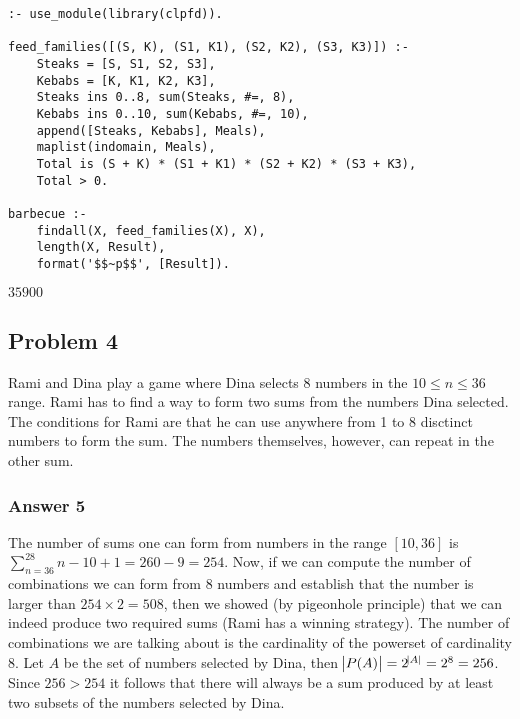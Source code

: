 \documentclass[11pt]{article}
\begin{document}
\lstset{language=prolog,label= ,caption= ,captionpos=b,numbers=none}
\begin{lstlisting}
:- use_module(library(clpfd)).

feed_families([(S, K), (S1, K1), (S2, K2), (S3, K3)]) :-
    Steaks = [S, S1, S2, S3],
    Kebabs = [K, K1, K2, K3],
    Steaks ins 0..8, sum(Steaks, #=, 8),
    Kebabs ins 0..10, sum(Kebabs, #=, 10),
    append([Steaks, Kebabs], Meals),
    maplist(indomain, Meals),
    Total is (S + K) * (S1 + K1) * (S2 + K2) * (S3 + K3),
    Total > 0.

barbecue :-
    findall(X, feed_families(X), X),
    length(X, Result),
    format('$$~p$$', [Result]).
\end{lstlisting}

\(35900\)

\subsection{Problem 4}
\label{sec:orgheadline9}
Rami and Dina play a game where Dina selects 8 numbers in the \(10 \leq n \leq
   36\) range.  Rami has to find a way to form two sums from the numbers Dina
selected.  The conditions for Rami are that he can use anywhere from 1 to
8 disctinct numbers to form the sum.  The numbers themselves, however, can
repeat in the other sum.

\subsubsection{Answer 5}
\label{sec:orgheadline8}
The number of sums one can form from numbers in the range \([10, 36]\) is
\(\sum_{n=36}^28 n - 10 + 1 = 260 - 9 = 254\).  Now, if we can compute the
number of combinations we can form from 8 numbers and establish that the
number is larger than \(254 \times 2 = 508\), then we showed (by pigeonhole
principle) that we can indeed produce two required sums (Rami has a winning
strategy).  The number of combinations we are talking about is the
cardinality of the powerset of cardinality 8.  Let \(A\) be the set of
numbers selected by Dina, then \(\abs{P(A)} = 2^{\abs{A}} = 2^8 = 256\).
Since \(256 > 254\) it follows that there will always be a sum produced by
at least two subsets of the numbers selected by Dina.
\end{document}
